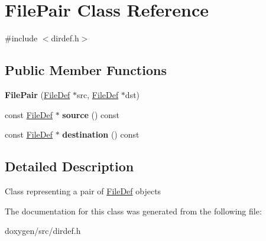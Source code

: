 \hypertarget{class_file_pair}{}\section{File\+Pair Class Reference}
\label{class_file_pair}


{\ttfamily \#include $<$dirdef.\+h$>$}

\subsection*{Public Member Functions}
\begin{DoxyCompactItemize}
\item 
\mbox{\label{class_file_pair_a9db0c7c11711d16f58452d498a0bd729}} 
{\bfseries File\+Pair} (\mbox{\hyperlink{class_file_def}{File\+Def}} $\ast$src, \mbox{\hyperlink{class_file_def}{File\+Def}} $\ast$dst)
\item 
\mbox{\label{class_file_pair_ae739446787304e5be8b3f9de7e85bf15}} 
const \mbox{\hyperlink{class_file_def}{File\+Def}} $\ast$ {\bfseries source} () const
\item 
\mbox{\label{class_file_pair_a4f64eca93cf2334b4b3bd1da9fb13a43}} 
const \mbox{\hyperlink{class_file_def}{File\+Def}} $\ast$ {\bfseries destination} () const
\end{DoxyCompactItemize}


\subsection{Detailed Description}
Class representing a pair of \mbox{\hyperlink{class_file_def}{File\+Def}} objects 

The documentation for this class was generated from the following file\+:\begin{DoxyCompactItemize}
\item 
doxygen/src/dirdef.\+h\end{DoxyCompactItemize}

